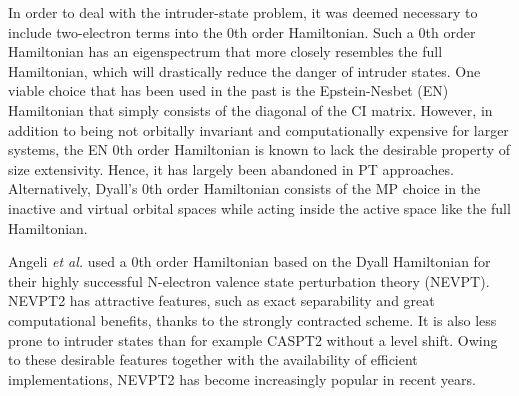 In order to deal with the intruder-state problem, it was deemed necessary to include two-electron terms into the 0th order Hamiltonian.\cite{AngelCM_2000_472} Such a 0th order Hamiltonian has an eigenspectrum that more closely resembles the full Hamiltonian, which will drastically reduce the danger of intruder states. One viable choice that has been used in the past is the Epstein-Nesbet (EN) Hamiltonian that simply consists of the diagonal of the CI matrix.\cite{Epste_1926_695, NesbeH_1955_312} However, in addition to being not orbitally invariant and computationally expensive for larger systems, the EN 0th order Hamiltonian is known to lack the desirable property of size extensivity.\cite{MalriS_1979_55} Hence, it has largely been abandoned in PT approaches. Alternatively, Dyall’s 0th order Hamiltonian consists of the MP choice in the inactive and virtual orbital spaces while acting inside the active space like the full Hamiltonian.\cite{Dyall_1995_4909}

Angeli \textit{et al.} used a 0th order Hamiltonian based on the Dyall Hamiltonian for their highly successful N-electron valence state perturbation theory (NEVPT).\cite{AngelCELM_2001_10252, AngelCM_2001_297} NEVPT2 has attractive features, such as exact separability and great computational benefits,\cite{SchapSN_2013_3567} thanks to the strongly contracted scheme.\cite{AngelCM_2001_297, SchapSN_2013_3567} It is also less prone to intruder states than for example CASPT2 without a level shift. Owing to these desirable features together with the availability of efficient implementations,\cite{SchapSN_2013_3567} NEVPT2 has become increasingly popular in recent years.\cite{RoemeGC_2016_204113, GuoWHSC_2016_1583, SharmC_2014_111101, GuoSVN_2016_94111}

